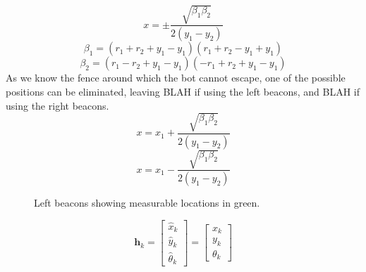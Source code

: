 	\begin{equation}
		x 		= \pm \frac{\sqrt{\beta_{1}\beta_{2}}}{2\left(y_{1}-y_{2}\right)}
	\end{equation}
	\begin{equation}
		\beta_{1} 	= \left(r_{1}+r_{2}+y_{1}-y_{1}\right)\left(r_{1}+r_{2}-y_{1}+y_{1}\right)
	\end{equation}
	\begin{equation}
		\beta_{2} 	=\left(r_{1}-r_{2}+y_{1}-y_{1}\right)\left(-r_{1}+r_{2}+y_{1}-y_{1}\right)
	\end{equation}
	As we know the fence around which the bot cannot escape, one of the possible positions can be eliminated, leaving BLAH if using the left beacons, and BLAH if using the right beacons.
	\begin{equation}
		x 		= x_{1}+\frac{\sqrt{\beta_{1}\beta_{2}}}{2\left(y_{1}-y_{2}\right)}
	\end{equation}
	\begin{equation}
		x 		= x_{1}-\frac{\sqrt{\beta_{1}\beta_{2}}}{2\left(y_{1}-y_{2}\right)}
	\end{equation}
	
	\begin{figure}
	\centering
		\label{fig:beac1}
		\caption{Left beacons showing measurable locations in green.}
	\end{figure}
	
	\begin{equation}
		\boldsymbol{h}_{ k} =
		\begin{bmatrix}
			\hat{x}_{k} 		\\
			\hat{y}_{k}		\\
			\hat{\theta}_{k}
		\end{bmatrix}
		=
		\begin{bmatrix}
			x_{k}		\\
			y_{k}		\\
			\theta_{k}
		\end{bmatrix}
	\end{equation}
	
